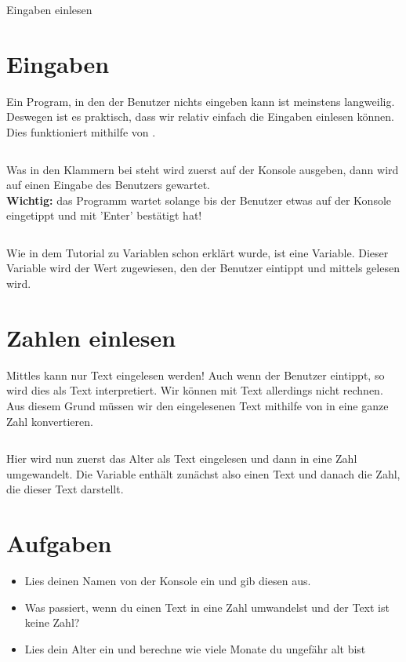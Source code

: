 \documentclass{\VorlagenPfad/coderdojokatext}
\newcommand{\Titel}{Eingaben einlesen}
\begin{document}
\begin{center}
	{\huge \Titel}
\end{center}

\section{Eingaben}
Ein Program, in den der Benutzer nichts eingeben kann ist meinstens langweilig.
Deswegen ist es praktisch, dass wir relativ einfach die Eingaben einlesen können.\\

Dies funktioniert mithilfe von .

\inputminted[firstline=1, lastline=2]{python}{../../../Beispiele/eingabe.py}
Was in den Klammern bei  steht wird zuerst auf der Konsole ausgeben, dann wird auf einen Eingabe des Benutzers gewartet.\\
\textbf{Wichtig:} das Programm wartet solange bis der Benutzer etwas auf der Konsole eingetippt und mit 'Enter' bestätigt hat!

\inputminted[firstline=2, lastline=2]{python}{../../../Beispiele/eingabe.py}

Wie in dem Tutorial zu Variablen schon erklärt wurde, ist  eine Variable. Dieser Variable wird der Wert zugewiesen, 
den der Benutzer eintippt und mittels  gelesen wird.

\section{Zahlen einlesen}
Mittles  kann nur Text eingelesen werden! Auch wenn der Benutzer  eintippt, so wird dies als Text  interpretiert.
Wir können mit Text allerdings nicht rechnen. Aus diesem Grund müssen wir den eingelesenen Text mithilfe von  in eine ganze Zahl konvertieren.

\inputminted[firstline=4, lastline=5]{python}{../../../Beispiele/eingabe.py}
Hier wird nun zuerst das Alter als Text eingelesen und dann in eine Zahl umgewandelt. Die Variable  enthält zunächst also einen Text und danach die Zahl, die dieser Text darstellt.

\section{Aufgaben}
\begin{itemize}
	\item Lies deinen Namen von der Konsole ein und gib diesen aus.
	\item Was passiert, wenn du einen Text in eine Zahl umwandelst und der Text ist keine Zahl?
	\item Lies dein Alter ein und berechne wie viele Monate du ungefähr alt bist
\end{itemize}
\end{document}
